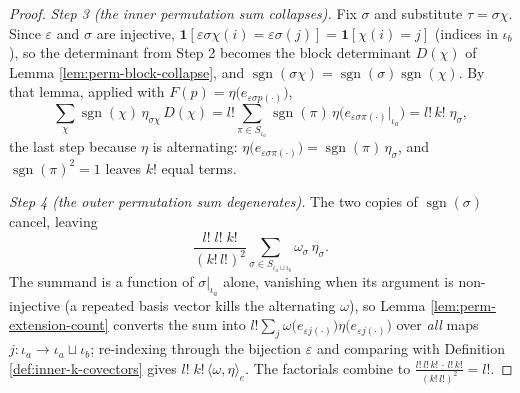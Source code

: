 \begin{proof}
\emph{Step 3 (the inner permutation sum collapses).} Fix $\sigma$ and substitute $\tau = \sigma\chi$. Since $\varepsilon$ and $\sigma$ are injective, $\mathbf{1}[\varepsilon\sigma\chi(i) = \varepsilon\sigma(j)] = \mathbf{1}[\chi(i) = j]$ (indices in $\iota_b$), so the determinant from Step 2 becomes the block determinant $D(\chi)$ of Lemma \ref{lem:perm-block-collapse}, and $\operatorname{sgn}(\sigma\chi) = \operatorname{sgn}(\sigma)\operatorname{sgn}(\chi)$. By that lemma, applied with $F(p) = \eta\big(e_{\varepsilon\sigma p(\cdot)}\big)$,
\[
\sum_{\chi} \operatorname{sgn}(\chi)\, \eta_{\sigma\chi}\, D(\chi) = l! \sum_{\pi \in S_{\iota_a}} \operatorname{sgn}(\pi)\, \eta\big(e_{\varepsilon\sigma\pi(\cdot)}|_{\iota_a}\big) = l!\,k!\; \eta_\sigma,
\]
the last step because $\eta$ is alternating: $\eta\big(e_{\varepsilon\sigma\pi(\cdot)}\big) = \operatorname{sgn}(\pi)\,\eta_\sigma$, and $\operatorname{sgn}(\pi)^2 = 1$ leaves $k!$ equal terms.

\emph{Step 4 (the outer permutation sum degenerates).} The two copies of $\operatorname{sgn}(\sigma)$ cancel, leaving
\[
\frac{l!\; l!\; k!}{(k!\,l!)^2} \sum_{\sigma \in S_{\iota_a \sqcup \iota_b}} \omega_\sigma\, \eta_\sigma.
\]
The summand is a function of $\sigma|_{\iota_a}$ alone, vanishing when its argument is non-injective (a repeated basis vector kills the alternating $\omega$), so Lemma \ref{lem:perm-extension-count} converts the sum into $l! \sum_{j} \omega\big(e_{\varepsilon j(\cdot)}\big)\eta\big(e_{\varepsilon j(\cdot)}\big)$ over \emph{all} maps $j \colon \iota_a \to \iota_a \sqcup \iota_b$; re-indexing through the bijection $\varepsilon$ and comparing with Definition \ref{def:inner-k-covectors} gives $l!\; k!\, \langle \omega, \eta\rangle_e$. The factorials combine to $\frac{l!\,l!\,k!\, \cdot\, l!\,k!}{(k!\,l!)^2} = l!$.
\end{proof}

